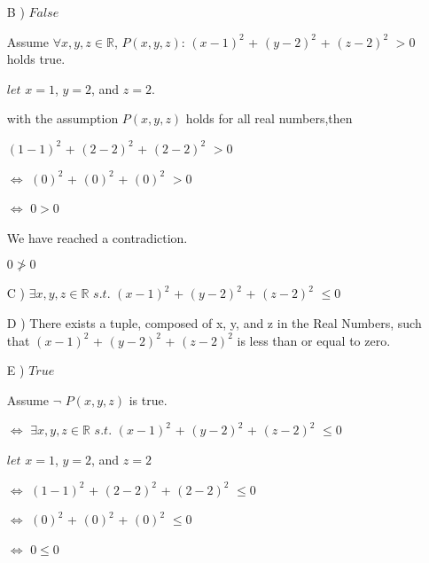 \documentclass[12pt]{article}
\newcommand{\R}{\mathbb R}
\newcommand{\ind}{\hspace{10mm}}
\begin{document}
\begin{enumerate}
\begin{enumerate}
      \item[B] ) $False$

      Assume $\forall x,y,z \in \R$, $P(x,y,z)$: $(x-1)^2$ + $(y-2)^2$ + $(z-2)^2$ $>$0 
      holds true.

      \ind $let$ $x=1$, $y=2$, and $z=2$. 
      
      \ind with the assumption $P(x,y,z)$ holds for all real numbers,then
  
      \ind \ind $(1-1)^2$ + $(2-2)^2$ + $(2-2)^2$ $>$0

      \ind \ind $\iff $ $(0)^2$ + $(0)^2$ + $(0)^2$ $>$0

      \ind \ind $\iff $ $0 > 0$

      \ind \ind We have reached a contradiction.

      \ind \ind $0 \ngtr 0$ \fboxsep=2mm \fboxrule=1mm 


      \item[C] ) $\exists x,y,z \in \R$ $s.t.$ $(x-1)^2$ + $(y-2)^2$ + $(z-2)^2$ $\leq$0

      \item[D] ) There exists a tuple, composed of x, y, and z in the Real Numbers, such that  $(x-1)^2$ + $(y-2)^2$ + $(z-2)^2$ is less than or equal to zero.

      \item[E] ) $True$

      \ind Assume $\neg $ $P(x,y,z)$ is true.

      \ind $\iff $ $\exists x,y,z \in \R$ $s.t.$ $(x-1)^2$ + $(y-2)^2$ + $(z-2)^2$ $\leq$0

      \ind $let$ $x=1$, $y=2$, and $z=2$

      \ind $\iff $ $(1-1)^2$ + $(2-2)^2$ + $(2-2)^2$ $\leq$0

      \ind \ind $\iff $ $(0)^2$ + $(0)^2$ + $(0)^2$ $\leq$0

      \ind \ind $\iff $ $0 \leq 0$ \fboxsep=2mm \fboxrule=1mm 

		
   \end{enumerate}

\end{enumerate}
\end{document}

